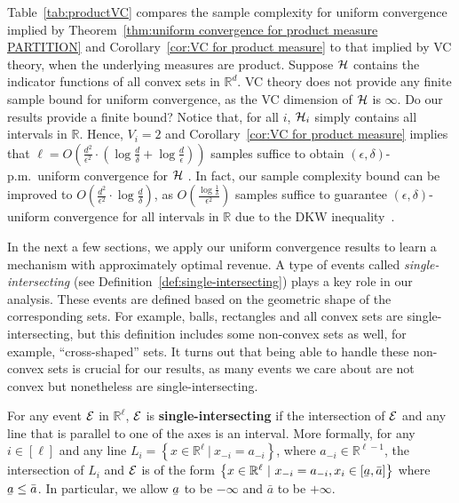Table~\ref{tab:productVC} compares the sample complexity for uniform convergence implied by Theorem~\ref{thm:uniform convergence for product measure PARTITION} and Corollary~\ref{cor:VC for product measure} to that implied by VC theory, when the underlying measures are product. Suppose ${\mathcal{H}}$ contains the indicator functions of all convex sets in $\mathbb{R}^d$. VC theory does not provide any finite sample  bound for  uniform convergence, as the VC dimension of ${\mathcal{H}}$ is $\infty$. Do our results provide a finite bound? Notice that, for all $i$, ${\mathcal{H}}_i$  simply contains all intervals in $\mathbb{R}$. Hence, $V_i=2$ and Corollary~\ref{cor:VC for product measure} implies that $\ell = O(\frac{d^2}{\epsilon^2}\cdot \left(\log \frac{d}{\delta}+\log \frac{d}{\epsilon}\right) )$ samples  suffice to obtain $(\epsilon,\delta)$-p.m.~uniform convergence for ${\mathcal{H}}$ . In fact, our sample complexity bound can be improved to $O\left(\frac{d^2}{\epsilon^2}\cdot \log \frac{d}{\delta}\right)$, as $O\left(\frac{\log \frac{1}{\delta}}{\epsilon^2}\right)$ samples suffice to guarantee $(\epsilon,\delta)$-uniform convergence for all intervals in $\mathbb{R}$ due to the DKW inequality~\cite{DvoretzkyKW56}. 


In the next a few sections, we apply our uniform convergence results to learn a mechanism with approximately optimal revenue. A type of events called \emph{single-intersecting} (see Definition~\ref{def:single-intersecting})   plays a key role in our analysis. These events are defined based on the geometric shape of the corresponding sets. For example, balls, rectangles and all convex sets are single-intersecting, but this definition includes some non-convex sets as well, for example, ``cross-shaped'' sets. It turns out that being able to handle these non-convex sets is crucial for our results, as many events we care about are not convex but nonetheless are single-intersecting. 

\begin{definition}\label{def:single-intersecting}
For any event ${\mathcal{E}}$ in $\mathbb{R}^{\ell}$, ${\mathcal{E}}$ is \textbf{single-intersecting} if the intersection of ${\mathcal{E}}$ and any line that is parallel to one of the axes is an interval. More formally, for any $i\in[\ell]$ and any line $L_i=\left\{x \in \mathbb{R}^{\ell}\ |\ x_{-i}=a_{-i} \right \}$, where $a_{-i} \in \mathbb{R}^{\ell-1}$, the intersection of $L_i$ and ${\mathcal{E}}$ is of the form $\left\{x \in \mathbb{R}^{\ell}\ |\ x_{-i}=a_{-i}, x_i\in[\ubar{a},\bar{a}] \right\}$ where $\ubar{a}\leq \bar{a}$. In particular, we allow $\ubar{a}$ to be $-\infty$ and $\bar{a}$ to be $+\infty$.
\end{definition}


